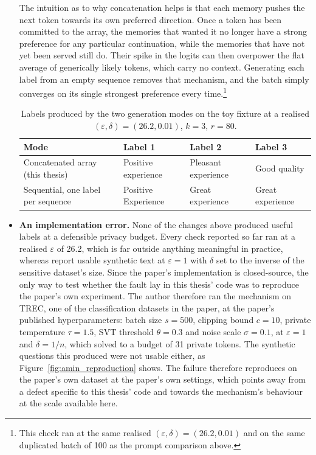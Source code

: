 \begin{itemize}
The intuition as to why concatenation helps is that each memory pushes the next token towards its own preferred direction. Once a token has been committed to the array, the memories that wanted it no longer have a strong preference for any particular continuation, while the memories that have not yet been served still do. Their spike in the logits can then overpower the flat average of generically likely tokens, which carry no context. Generating each label from an empty sequence removes that mechanism, and the batch simply converges on its single strongest preference every time.\footnote{This check ran at the same realised $(\varepsilon, \delta) = (26.2, 0.01)$ and on the same duplicated batch of 100 as the prompt comparison above.}

\begin{table}[t]
\centering
\begin{tabular}{@{}llll@{}}
\toprule
\textbf{Mode} & \textbf{Label 1} & \textbf{Label 2} & \textbf{Label 3} \\
\midrule
Concatenated array (this thesis) & Positive experience & Pleasant experience & Good quality \\
Sequential, one label per sequence \citep{amin2024private} & Positive Experience & Great experience & Great experience \\
\bottomrule
\end{tabular}
\caption{Labels produced by the two generation modes on the toy fixture at a realised $(\varepsilon, \delta) = (26.2, 0.01)$, $k = 3$, $r = 80$.}
\label{tab:label-mode-comparison}
\end{table}

\item \textbf{An implementation error.} None of the changes above produced useful labels at a defensible privacy budget. Every check reported so far ran at a realised $\varepsilon$ of 26.2, which is far outside anything meaningful in practice, whereas \citet{amin2024private} report usable synthetic text at $\varepsilon = 1$ with $\delta$ set to the inverse of the sensitive dataset's size. Since the paper's implementation is closed-source, the only way to test whether the fault lay in this thesis' code was to reproduce the paper's own experiment. The author therefore ran the mechanism on TREC, one of the classification datasets in the paper, at the paper's published hyperparameters: batch size $s = 500$, clipping bound $c = 10$, private temperature $\tau = 1.5$, SVT threshold $\theta = 0.3$ and noise scale $\sigma = 0.1$, at $\varepsilon = 1$ and $\delta = 1/n$, which solved to a budget of 31 private tokens. The synthetic questions this produced were not usable either, as Figure~\ref{fig:amin_reproduction} shows. The failure therefore reproduces on the paper's own dataset at the paper's own settings, which points away from a defect specific to this thesis' code and towards the mechanism's behaviour at the scale available here.


\end{itemize}
